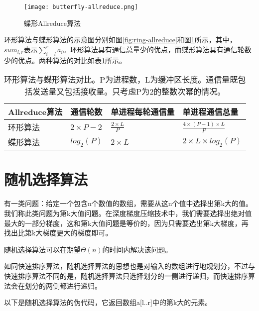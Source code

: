 \begin{figure}[ht] %
    \centering
    \texttt{[image: butterfly-allreduce.png]}
    \caption{蝶形Allreduce算法}
    \label{fig:butter-allreduce}
\end{figure}


环形算法与蝶形算法的示意图分别如图\ref{fig:ring-allreduce}和图\ref{fig:butter-allreduce}所示，其中，$sum_{l,r}$表示$\sum_{i = l}^r a_i$。环形算法具有通信总量少的优点，而蝶形算法具有通信轮数少的优点。两种算法的对比如表\ref{tab:Allreduce}所示。

\begin{table}[htb]
    \centering
    \caption[环形算法与蝶形算法对比]{环形算法与蝶形算法对比。P为进程数，L为缓冲区长度。通信量既包括发送量又包括接收量。只考虑P为2的整数次幂的情况。}
    \label{tab:Allreduce}
    \begin{tabularx}{\linewidth}{lXXX}
        \toprule[1.5pt]
        {Allreduce算法} & {通信轮数} & {单进程每轮通信量} & {单进程通信总量}\\\midrule[1pt]
        环形算法 & $2 \times P - 2$ & $\frac{2 \times L}{P}$ & $ \frac{4 \times (P - 1)\times L}{P}$\\
        蝶形算法 & $log_2(P)$ & $2\times L$ & $2 \times L \times log_2(P)$\\
        \bottomrule[1.5pt]
    \end{tabularx}
\end{table}

\section{随机选择算法}
有一类问题：给定一个包含n个数值的数组，需要从这n个值中选择出第k大的值。我们称此类问题为第k大值问题。在深度梯度压缩技术中，我们需要选择出绝对值最大的一部分梯度，这和第k大值问题是等价的，因为只需要选出第k大梯度，再找出比第k大梯度更大的梯度即可。

随机选择算法\cite{IntroToAlgo}可以在期望$\Theta(n)$的时间内解决该问题。

如同快速排序算法，随机选择算法的思想也是对输入的数组进行地规划分，不过与快速排序算法不同的是，随机选择算法只选择划分的一侧进行递归，而快速排序算法会在划分的两侧都进行递归。

以下是随机选择算法的伪代码，它返回数组a[l..r]中的第k大的元素。


